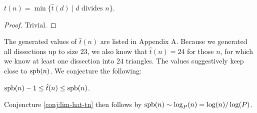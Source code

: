 \begin{lem}
$t(n) = \min \{\hat t(d) \mid d \mbox{ divides } n\}$.
\end{lem}
\begin{proof}
Trivial.
\end{proof}



The generated values of $\hat t(n)$ are listed in Appendix A. Because we generated all dissections up to size $23$, we also know that $\hat t(n) = 24$ for those $n$, for which we know at least one dissection into $24$ triangles. The values suggestively keep close to $\mathop{\mathrm{spb}}(n)$. We conjecture the following:

\begin{conj} $\mathop{\mathrm{spb}}(n)-1 \leq \hat t(n) \leq \mathop{\mathrm{spb}}(n)$.
\end{conj}%

Conjencture \ref{conj:lim-hat-tn} then follows by $\mathop{\mathrm{spb}}(n) \sim \log_P(n) = \log(n)/\log(P)$.



